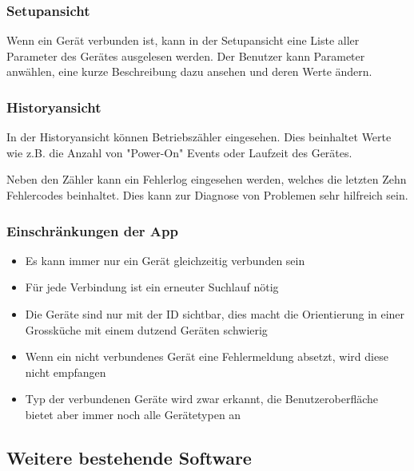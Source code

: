 \subsubsection{Setupansicht}
\label{subsubsec:Setupansicht}
Wenn ein Gerät verbunden ist, kann in der Setupansicht eine Liste aller Parameter des Gerätes ausgelesen werden. Der Benutzer kann Parameter anwählen, eine kurze Beschreibung dazu ansehen und deren Werte ändern.

\subsubsection{Historyansicht}
\label{subsubsec:Ansichten}
In der Historyansicht können Betriebszähler eingesehen. Dies beinhaltet Werte wie z.B. die Anzahl von "Power-On" Events oder Laufzeit des Gerätes.

Neben den Zähler kann ein Fehlerlog eingesehen werden, welches die letzten Zehn Fehlercodes beinhaltet. Dies kann zur Diagnose von Problemen sehr hilfreich sein.

\subsubsection{Einschränkungen der App}
\label{subsubsec:Einschränkungen der App}
\begin{itemize}
\item Es kann immer nur ein Gerät gleichzeitig verbunden sein
\item Für jede Verbindung ist ein erneuter Suchlauf nötig
\item Die Geräte sind nur mit der ID sichtbar, dies macht die Orientierung in einer Grossküche mit einem dutzend Geräten schwierig
\item Wenn ein nicht verbundenes Gerät eine Fehlermeldung absetzt, wird diese nicht empfangen
\item Typ der verbundenen Geräte wird zwar erkannt, die Benutzeroberfläche bietet aber immer noch alle Gerätetypen an
\end{itemize}

\subsection{Weitere bestehende Software}
\label{subsec:Weitere bestehende Software}
